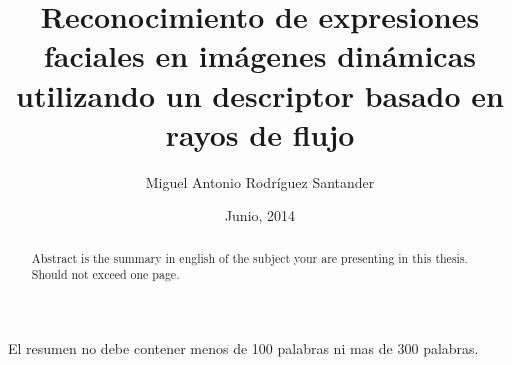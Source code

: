 \documentclass{udpthesis}
\begin{document}
\frontmatter
\title{Reconocimiento de expresiones faciales en imágenes dinámicas utilizando un descriptor basado en rayos de flujo}

\author{Miguel Antonio Rodríguez Santander}

\date{Junio, 2014}




\makecover

\tableofcontents%
\listoffigures%
\listoftables%

\begin{abstract}
Abstract is the summary in english of the subject your are presenting in this thesis. Should not exceed one page.
\end{abstract}

\begin{resumen}
El resumen no debe contener menos de 100 palabras ni mas de 300 palabras.
\end{resumen}



\mainmatter










%
% 
\end{document}
